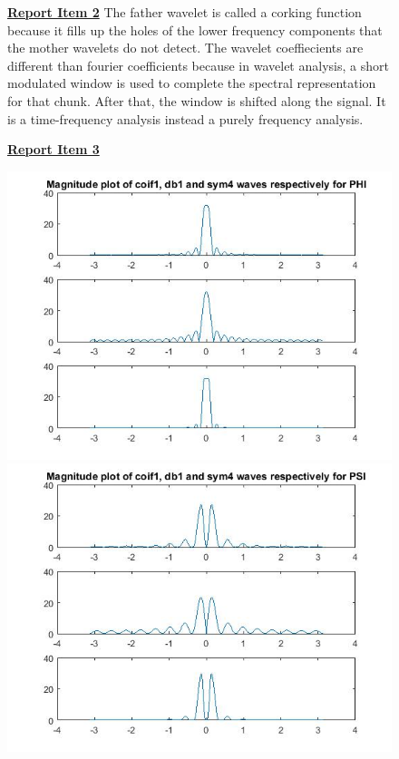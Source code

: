 \documentclass{article}
\begin{document}
\begin{figure}[H]
\color{red}
\underline{\textbf{Report Item 2}}
\color{black}
The father wavelet is called a corking function because it fills up the holes of the lower frequency components that the mother wavelets do not detect. The wavelet coeffiecients are different than fourier coefficients because in wavelet analysis, a short modulated window is used to complete
the spectral representation for that chunk. After that, the window is shifted along the signal. It is a time-frequency analysis instead a purely frequency analysis.
\end{figure}


\begin{figure}[H]
\color{red}
\underline{\textbf{Report Item 3}}
\color{black}

\end{figure}

\begin{figure}[H]
  \includegraphics[scale=.5]{2_phi}
  \includegraphics[scale=.5]{2_psi}
  \end{figure}
\end{document}
